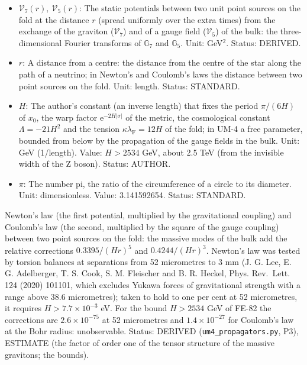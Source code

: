 \documentclass[
  10pt,
]{article}
\providecommand{\tightlist}{%
  \setlength{\itemsep}{0pt}\setlength{\parskip}{0pt}}
\begin{document}
\begin{itemize}
\tightlist
\item
  \(\mathcal{V}_7(r),\ \mathcal{V}_5(r)\): The static potentials between
  two unit point sources on the fold at the distance \(r\) (spread
  uniformly over the extra times) from the exchange of the graviton
  (\(\mathcal{V}_7\)) and of a gauge field (\(\mathcal{V}_5\)) of the
  bulk: the three-dimensional Fourier transforms of \(\mathbb{G}_7\) and
  \(\mathbb{G}_5\). Unit: GeV\(^2\). Status: DERIVED.
\item
  \(r\): A distance from a centre: the distance from the centre of the
  star along the path of a neutrino; in Newton's and Coulomb's laws the
  distance between two point sources on the fold. Unit: length. Status:
  STANDARD.
\item
  \(H\): The author's constant (an inverse length) that fixes the period
  \(\pi/(6H)\) of \(x_0\), the warp factor
  \(\mathrm{e}^{-2H\lvert\sigma\rvert}\) of the metric, the cosmological
  constant \(\Lambda = -21H^2\) and the tension
  \(\kappa\lambda_{\mathrm{F}} = 12H\) of the fold; in UM-4 a free
  parameter, bounded from below by the propagation of the gauge fields
  in the bulk. Unit: GeV (1/length). Value: \(H > 2534\) GeV, about 2.5
  TeV (from the invisible width of the Z boson). Status: AUTHOR.
\item
  \(\pi\): The number pi, the ratio of the circumference of a circle to
  its diameter. Unit: dimensionless. Value: 3.141592654. Status:
  STANDARD.
\end{itemize}

Newton's law (the first potential, multiplied by the gravitational
coupling) and Coulomb's law (the second, multiplied by the square of the
gauge coupling) between two point sources on the fold: the massive modes
of the bulk add the relative corrections \(0.3395/(Hr)^5\) and
\(0.4244/(Hr)^3\). Newton's law was tested by torsion balances at
separations from 52 micrometres to 3 mm (J. G. Lee, E. G. Adelberger, T.
S. Cook, S. M. Fleischer and B. R. Heckel, Phys. Rev.~Lett. 124 (2020)
101101, which excludes Yukawa forces of gravitational strength with a
range above 38.6 micrometres); taken to hold to one per cent at 52
micrometres, it requires \(H > 7.7\times10^{-3}\) eV. For the bound
\(H > 2534\) GeV of FE-82 the corrections are \(2.6\times10^{-75}\) at
52 micrometres and \(1.4\times10^{-27}\) for Coulomb's law at the Bohr
radius: unobservable. Status: DERIVED (\texttt{um4\_propagators.py},
P3), ESTIMATE (the factor of order one of the tensor structure of the
massive gravitons; the bounds).
\end{document}
